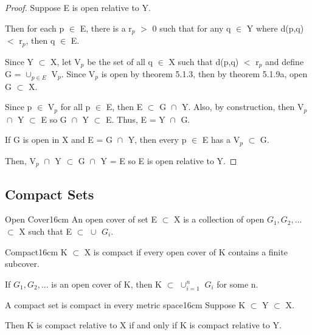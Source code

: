 	\begin{proof}
		Suppose E is open relative to Y.

		Then for each p $\in$ E, there is a r$_p$ $>$ 0 such that for
		any q $\in$ Y where d(p,q) $<$ r$_p$, then q $\in$ E.
		
		Since Y $\subset$ X, let V$_p$ be the set of all q $\in$ X
		such that d(p,q) $<$ r$_p$ and define G = $\cup_{p \in E}^{}$ V$_p$.
		Since V$_p$ is open by {\color{red} theorem 5.1.3}, then by
		{\color{red} theorem 5.1.9a}, open G $\subset$ X.

		Since p $\in$ V$_p$ for all p $\in$ E, then E $\subset$ G $\cap_{}^{}$ Y.
		Also, by construction, then V$_p$ $\cap_{}^{}$ Y $\subset$ E so
		G $\cap_{}^{}$ Y $\subset$ E.
		Thus, E = Y $\cap_{}^{}$ G.

		If G is open in X and E = G $\cap_{}^{}$ Y, then every p $\in$ E has
		a V$_p$ $\subset$ G.

		Then, V$_p$ $\cap_{}^{}$ Y $\subset$ G $\cap_{}^{}$ Y = E so
		E is open relative to Y.
	\end{proof}

	\vspace{0.3cm}

	



\subsection{ Compact Sets }

	\begin{definition}{Open Cover}{16cm}
		An {\color{lblue} open cover} of set E $\subset$ X is a collection of
		open $G_1, G_2, ...$ $\subset$ X
		such that E $\subset$ $\cup_{}^{}$ $G_i$.
	\end{definition}
	
	\vspace{0.5cm}



	\begin{definition}{Compact}{16cm}
		K $\subset$ X is {\color{lblue} compact} if every open cover
		of K contains a finite subcover.

		\qquad If $G_1, G_2, ...$ is an open cover of K, then
		K $\subset$ $\cup_{i=1}^{n}$ $G_i$ for some n.
	\end{definition}
	
	\vspace{0.5cm}



	\begin{wtheorem}{A compact set is compact in every metric space}{16cm}
		Suppose K $\subset$ Y $\subset$ X.

		Then K is compact relative to X if and only if K is
		compact relative to Y.
	\end{wtheorem}
	
